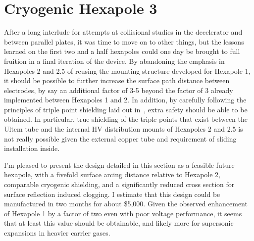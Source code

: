 \section{Cryogenic Hexapole 3}

After a long interlude for attempts at collisional studies in the decelerator and between parallel plates, it was time to move on to other things, but the lessons learned on the first two and a half hexapoles could one day be brought to full fruition in a final iteration of the device.
By abandoning the emphasis in Hexapoles 2 and 2.5 of reusing the mounting structure developed for Hexapole 1, it should be possible to further increase the surface path distance between electrodes, by say an additional factor of 3-5 beyond the factor of 3 already implemented between Hexapoles 1 and 2.
In addition, by carefully following the principles of triple point shielding laid out in~\citep[Sec.~4.3.3]{Faircloth2013}, extra safety should be able to be obtained.
In particular, true shielding of the triple points that exist between the Ultem tube and the internal HV distribution mounts of Hexapoles 2 and 2.5 is not really possible given the external copper tube and requirement of sliding installation inside.

I'm pleased to present the design detailed in this section as a feasible future hexapole, with a fivefold surface arcing distance relative to Hexapole 2, comparable cryogenic shielding, and a significantly reduced cross section for surface reflection induced clogging.
I estimate that this design could be manufactured in two months for about \$5,000.
Given the observed enhancement of Hexapole 1 by a factor of two even with poor voltage performance, it seems that at least this value should be obtainable, and likely more for supersonic expansions in heavier carrier gases.














\ifx\justbeingincluded\undefined

\fi
